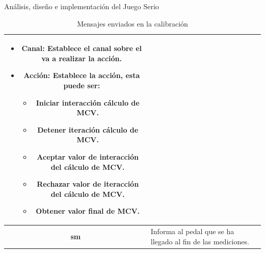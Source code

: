 \begin{thesischapter}{2} {Análisis, diseño e implementación del Juego Serio}
\begin{table}[h]
\begin{tabular}{ |c|p{14cm}|}
\begin{minipage}{14cm}
                                    \begin{itemize}
                                        \item \textbf{Canal}: Establece el canal sobre el va a realizar la acción.
                                        \item \textbf{Acción}: Establece la acción, esta puede ser: 
                                        \begin{itemize}
                                            \item Iniciar interacción cálculo de MCV.
                                            \item Detener iteración cálculo de MCV.
                                            \item Aceptar valor de interacción del cálculo de MCV.
                                            \item Rechazar valor de iteracción del cálculo de MCV.
                                            \item Obtener valor final de MCV.
                                        \end{itemize}
                                    \end{itemize} 
                                    \vspace{1pt}
                                \end{minipage}\\\hline
            \textbf{sm}     &   Informa al pedal que se ha llegado al fin de las mediciones. \\\hline               

        \end{tabular}
        \label{table:send-msg-in-calibration}
        \caption{Mensajes enviados en la calibración}
    \end{table}  


\end{thesischapter}
